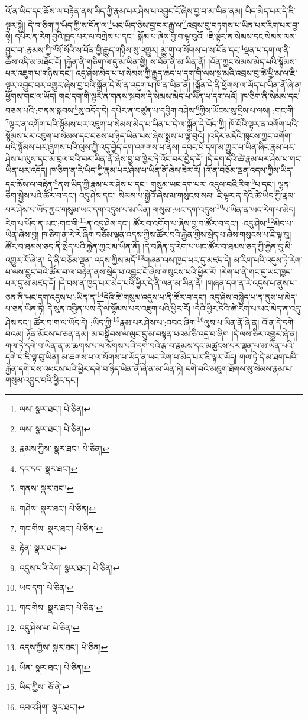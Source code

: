 འོ་ན་ཡིད་དང་ཆོས་ལ་བརྟེན་ནས་ཡིད་ཀྱི་རྣམ་པར་ཤེས་པ་འབྱུང་ངོ་ཞེས་བྱ་བ་མ་ཡིན་ནམ། ཡིད་མེད་པར་དེ་ཇི་ལྟར་སྐྱེ། དེ་ཁ་ཅིག་ཏུ་ཡིད་ཀྱི་ས་བོན་ལ་\footnote{ལས་  སྣར་ཐང་།  པེ་ཅིན། }ཡང་ཡིད་ཅེས་བྱ་བར་རྒྱུ་ལ་\footnote{ལས་  སྣར་ཐང་།  པེ་ཅིན། }འབྲས་བུ་བཏགས་པ་ཡིན་པར་རིག་པར་བྱ་སྟེ། དཔེར་ན་རེག་བྱའི་ཁྱད་པར་ལ་བཀྲེས་པ་དང་། སྐོམ་པ་ཞེས་བྱ་བ་ལྟ་བུའོ། །ཇི་ལྟར་ན་སེམས་དང་སེམས་ལས་བྱུང་བ་:རྣམས་ཀྱི་\footnote{རྣམས་ཀྱིས་  སྣར་ཐང་།  པེ་ཅིན། }སོ་སོའི་ས་བོན་གྱི་རྒྱུད་གཉིས་སུ་འགྱུར། མྱུ་གུ་ལ་སོགས་པ་ས་བོན་དང་\footnote{དང་དང་  སྣར་ཐང་། }ལྡན་པ་དག་ལ་ནི་ཆོས་འདི་མ་མཐོང་ངོ། །རྐྱེན་ནི་གཅིག་ལ་དུ་མ་ཡིན་གྱི། ས་བོན་ནི་མ་ཡིན་ནོ། །འོན་ཀྱང་སེམས་མེད་པའི་སྙོམས་པར་འཇུག་པ་གཉིས་དང་། འདུ་ཤེས་མེད་པ་པ་སེམས་ཀྱི་རྒྱུད་ཆད་པ་དག་གི་ལས་སྔ་མའི་འབྲས་བུ་ཚེ་ཕྱི་མ་ལ་ཇི་ལྟར་འབྱུང་བར་འགྱུར་ཞེས་བྱ་བའི་སྐྱོན་དེ་སོ་ན་འདུག་པ་ཁོ་ན་ཡིན་ནོ། །སྐྱོན་དེ་ནི་ཕྱོགས་ལ་ཡོད་པ་ཡིན་ནོ་ཞེ་ན། ཕྱོགས་གང་ལ་ཡོད། གང་དག་གི་ལྟར་ན་གནས་སྐབས་དེ་སེམས་མེད་པ་ཡིན་པ་དག་ལའོ། །ཁ་ཅིག་ནི་སེམས་དང་བཅས་པའི་:གནས་སྐབས་\footnote{གནས་  སྣར་ཐང་། }སུ་འདོད་དེ། དཔེར་ན་བཙུན་པ་དབྱིག་བཤེས་\footnote{གཤེས་  སྣར་ཐང་།  པེ་ཅིན། }ཀྱིས་ཡོངས་སུ་དྲིས་པ་ལས། :གང་གི་\footnote{གང་གིས་  སྣར་ཐང་།  པེ་ཅིན། }ལྟར་ན་འགོག་པའི་སྙོམས་པར་འཇུག་པ་སེམས་མེད་པ་ཡིན་པ་དེ་ལ་སྐྱོན་དེ་ཡོད་ཀྱི། ཁོ་བོའི་ལྟར་ན་འགོག་པའི་སྙོམས་པར་འཇུག་པ་སེམས་དང་བཅས་པ་ཉིད་ཡིན་པས་ཞེས་སྨྲས་པ་ལྟ་བུའོ། །འདིར་མདོའི་ཁུངས་ཀྱང་འགོག་པའི་སྙོམས་པར་ཞུགས་པའི་ལུས་ཀྱི་འདུ་བྱེད་དག་འགགས་པ་ནས། དབང་པོ་དག་མ་གྱུར་པ་ཡིན་ཞིང་རྣམ་པར་ཤེས་པ་ལུས་དང་མ་བྲལ་བའི་བར་ཡིན་ནོ་ཞེས་བྱ་བ་ཁྱེར་ཏེ་འོང་བར་བྱེད་དོ། །དེ་དག་དེའི་ཚེ་རྣམ་པར་ཤེས་པ་གང་ཡིན་པར་འདོད། ཁ་ཅིག་ན་རེ་ཡིད་ཀྱི་རྣམ་པར་ཤེས་པ་ཡིན་ནོ་ཞེས་ཟེར་རོ། །འོ་ན་བཅོམ་ལྡན་འདས་ཀྱིས་ཡིད་དང་ཆོས་ལ་བརྟེན་\footnote{རྟེན་  སྣར་ཐང་། }ནས་ཡིད་ཀྱི་རྣམ་པར་ཤེས་པ་དང་། གསུམ་ཡང་དག་པར་:འདུལ་བའི་རིག་\footnote{འདུས་པའི་རེག་  སྣར་ཐང་།  པེ་ཅིན། }པ་དང་། ལྷན་ཅིག་སྐྱེས་པའི་ཚོར་བ་དང་། འདུ་ཤེས་དང་། སེམས་པ་སྐྱེའོ་ཞེས་མ་གསུངས་སམ། ཇི་ལྟར་ན་དེའི་ཚེ་ཡིད་ཀྱི་རྣམ་པར་ཤེས་པ་ཡོད་ཀྱང་གསུམ་ཡང་དག་འདུས་པ་མ་ཡིན། གསུམ་:ཡང་དག་འདུས་\footnote{ཡང་དག་  པེ་ཅིན། }པ་ཡིན་ན་ཡང་རེག་པ་མེད། རེག་པ་ཡོད་ན་ཡང་:གང་གི་\footnote{གང་གིས་  སྣར་ཐང་།  པེ་ཅིན། }ན་འདུ་ཤེས་དང་། ཚོར་བ་འགོག་པ་ཞེས་བྱ་བ་ཚོར་བ་དང་། :འདུ་ཤེས་\footnote{འདུ་ཤེས་པ་  པེ་ཅིན། }མེད་པ་ཡིན་ཞེས་བྱ། ཁ་ཅིག་ན་རེ་རེ་ཞིག་བཅོམ་ལྡན་འདས་ཀྱིས་ཚོར་བའི་རྐྱེན་གྱིས་སྲེད་པ་ཞེས་གསུངས་པ་ཇི་ལྟ་བུ། ཚོར་བ་ཐམས་ཅད་ནི་སྲེད་པའི་རྐྱེན་ཀྱང་མ་ཡིན་ནོ། །དེ་བཞིན་དུ་རེག་པ་ཡང་ཚོར་བ་ཐམས་ཅད་ཀྱི་རྐྱེན་དུ་མི་འགྱུར་རོ་ཞེ་ན། དེ་ནི་བཅོམ་ལྡན་:འདས་ཀྱིས་མདོ་\footnote{འདས་ཀྱིས་  སྣར་ཐང་།  པེ་ཅིན། }གཞན་ལས་ཁྱད་པར་དུ་མཛད་དེ། མ་རིག་པའི་འདུས་ཏེ་རེག་པ་ལས་བྱུང་བའི་ཚོར་བ་ལ་བརྟེན་ནས་སྲེད་པ་འབྱུང་ངོ་ཞེས་གསུངས་པའི་ཕྱིར་རོ། །རེག་པ་ནི་གང་དུ་ཡང་ཁྱད་པར་དུ་མ་མཛད་དོ། །དེ་བས་ན་ཁྱད་པར་མེད་པའི་ཕྱིར་དེ་ནི་ལན་མ་ཡིན་ནོ། །གཞན་དག་ན་རེ་འདུས་པ་ནུས་པ་ཅན་ནི་ཡང་དག་འདུས་པ་:ཡིན་ན་\footnote{ཡིན་  སྣར་ཐང་།  པེ་ཅིན། }དེའི་ཚེ་གསུམ་འདུས་པ་ནི་ཚོར་བ་དང་། འདུ་ཤེས་བསྐྱེད་པ་ན་ནུས་པ་མེད་པ་ཅན་ཡིན་ཏེ། དེ་སུན་འབྱིན་པས་དེ་ལ་སྙོམས་པར་འཇུག་པའི་ཕྱིར་རོ། །དེའི་ཕྱིར་དེའི་ཚེ་རེག་པ་ཡང་མེད་ན་འདུ་ཤེས་དང་། ཚོར་བ་ག་ལ་ཡོད་དེ། :ཡིད་ཀྱི་\footnote{ཡིད་ཀྱིས་  ཅོ་ནེ། }རྣམ་པར་ཤེས་པ་:འབའ་ཞིག་\footnote{འབའ་ཤིག་  སྣར་ཐང་། }ལུས་པ་ཡིན་ནོ་ཞེ་ན། འོ་ན་དེ་དགེ་བའམ། ཉོན་མོངས་པ་ཅན་ནམ། མ་བསྒྲིབས་ལ་ལུང་དུ་མ་བསྟན་པའམ་ཅི་འདྲ་བ་ཞིག །དེ་ལས་ཅིར་འགྱུར་ཞེ་ན། གལ་ཏེ་དགེ་བ་ཡིན་ན་མ་ཆགས་པ་ལ་སོགས་པའི་དགེ་བའི་རྩ་བ་རྣམས་དང་མཚུངས་པར་ལྡན་པ་མ་ཡིན་པའི་དགེ་བ་ཇི་ལྟ་བུ་ཡིན། མ་ཆགས་པ་ལ་སོགས་པ་ཡོད་ན་ཡང་རེག་པ་མེད་པར་ཇི་ལྟར་ཡོད། གལ་ཏེ་དེ་མ་ཐག་པའི་རྐྱེན་དགེ་བས་འཕངས་པའི་ཕྱིར་དགེ་བ་ཉིད་ཡིན་ནོ་ཞེ་ན་མ་ཡིན་ཏེ། དགེ་བའི་མཇུག་ཐོགས་སུ་སེམས་རྣམ་པ་གསུམ་འབྱུང་བའི་ཕྱིར་དང་། 
